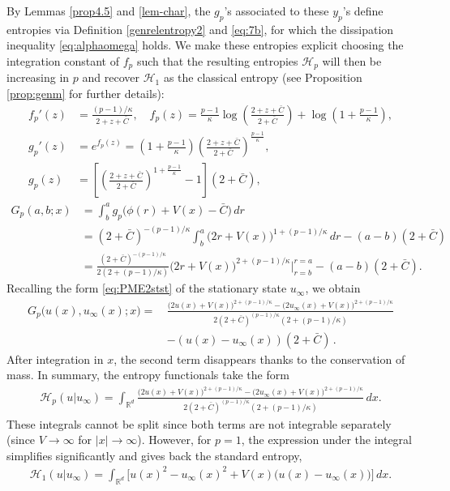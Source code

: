 \documentclass[reqno]{amsart}
\newcommand{\R}{\mathbb{R}}
\begin{document}
By Lemmas \ref{prop4.5} and \ref{lem-char}, the $g_p$'s associated to these $y_p$'s define entropies via Definition \ref{genrelentropy2} and \eqref{eq:7b}, for which the dissipation inequality \eqref{eq:alphaomega} holds. We make these entropies explicit choosing the integration constant of $f_p$ such that the resulting entropies $\mathcal H_p$ will then be increasing in $p$ and recover  $\mathcal H_1$ as the classical entropy (see Proposition \ref{prop:genm} for further details): 
\begin{align*}
    f_p'(z) &= \frac{(p-1)/\kappa}{2+z+\bar C}, 
    \quad 
    f_p(z) = \frac{p-1}\kappa\log\left(\frac{2+z+\bar C}{2+\bar C} \right)+\log\left(1+\frac{p-1}{\kappa}\right),\\
    g_p'(z) &= e^{f_p(z)} = \left(1+\frac{p-1}{\kappa}\right)\left(\frac{2+z+\bar C}{2+\bar C} \right)^{\frac{p-1}{\kappa}}, \\ 
    g_p(z) &= \left[\left(\frac{2+z+\bar C}{2+\bar C} \right)^{1+\frac{p-1}{\kappa}} - 1\right]\left(2+\bar C\right),
    \end{align*}
    \begin{align*}
    G_p(a,b;x) &= \int_b^a g_p\big(\phi(r)+V(x)-\bar C\big)\,dr \\
          &= (2+\bar C)^{-(p-1)/\kappa} \int_b^a \big(2r+V(x)\big)^{1+(p-1)/\kappa}\,dr -(a-b) (2+\bar C)\\
          &= \frac{(2+\bar C)^{-(p-1)/\kappa} }{2(2+(p-1)/\kappa)}
          \big(2r+V(x)\big)^{2+(p-1)/\kappa}\Big|_{r=b}^{r=a} -(a-b)(2+\bar C).
\end{align*}
Recalling the form \eqref{eq:PME2stst} of the stationary state $u_\infty$, we obtain
\begin{align*}
    G_p\big(u(x),u_\infty(x);x\big) 
    =\,&\frac{ \big(2u(x)+V(x)\big)^{2+(p-1)/\kappa} - \big(2u_\infty(x)+V(x)\big)^{2+(p-1)/\kappa}}{2(2+\bar C)^{(p-1)/\kappa}(2+(p-1)/\kappa)}\\
      &-(u(x)-u_\infty(x))(2+\bar C)\,.
\end{align*}
After integration in $x$, the second term disappears thanks to the conservation of mass. In summary, the entropy functionals take the form
\begin{align}\label{H_p}
    \mathcal H_p(u|u_\infty)
    =\int_{\R^d}  \frac{ \big(2u(x)+V(x)\big)^{2+(p-1)/\kappa} - \big(2u_\infty(x)+V(x)\big)^{2+(p-1)/\kappa}}{2(2+\bar C)^{(p-1)/\kappa}(2+(p-1)/\kappa)}\,dx.
\end{align}
These integrals cannot be split since both terms are not integrable separately (since $V\to\infty$ for $|x|\to\infty$). However, for $p=1$, the expression under the integral simplifies significantly and gives back the standard entropy,
\begin{align*}
    \mathcal H_1(u|u_\infty)
    = \int_{\R^d} \big[u(x)^2-u_\infty(x)^2+V(x)\big(u(x)-u_\infty(x)\big)\big]\,dx.
\end{align*}
\end{document}
